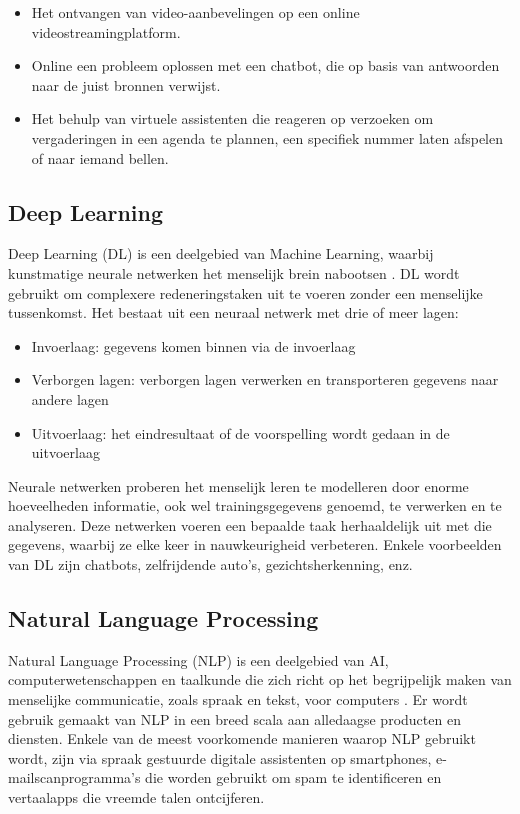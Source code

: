 \begin{itemize}
  \item Het ontvangen van video-aanbevelingen op een online videostreamingplatform.
  \item	Online een probleem oplossen met een chatbot, die op basis van antwoorden naar de juist bronnen verwijst.
  \item	Het behulp van virtuele assistenten die reageren op verzoeken om vergaderingen in een agenda te plannen, een specifiek nummer laten afspelen of naar iemand bellen.
\end{itemize}

\subsection{Deep Learning}
Deep Learning (DL) is een deelgebied van Machine Learning, waarbij kunstmatige neurale netwerken het menselijk brein nabootsen \autocite{Coursera2024a}. DL wordt gebruikt om complexere redeneringstaken uit te voeren zonder een menselijke tussenkomst. Het bestaat uit een neuraal netwerk met drie of meer lagen: 
\begin{itemize}
  \item	Invoerlaag: gegevens komen binnen via de invoerlaag
  \item	Verborgen lagen: verborgen lagen verwerken en transporteren gegevens naar andere lagen
  \item	Uitvoerlaag: het eindresultaat of de voorspelling wordt gedaan in de uitvoerlaag
\end{itemize}
Neurale netwerken proberen het menselijk leren te modelleren door enorme hoeveelheden informatie, ook wel trainingsgegevens genoemd, te verwerken en te analyseren. Deze netwerken voeren een bepaalde taak herhaaldelijk uit met die gegevens, waarbij ze elke keer in nauwkeurigheid verbeteren. Enkele voorbeelden van DL zijn chatbots, zelfrijdende auto’s, gezichtsherkenning, enz.

\subsection{Natural Language Processing}
Natural Language Processing (NLP) is een deelgebied van AI, computerwetenschappen en taalkunde die zich richt op het begrijpelijk maken van menselijke communicatie, zoals spraak en tekst, voor computers \autocite{Coursera2024b}. Er wordt gebruik gemaakt van NLP in een breed scala aan alledaagse producten en diensten. Enkele van de meest voorkomende manieren waarop NLP gebruikt wordt, zijn via spraak gestuurde digitale assistenten op smartphones, e-mailscanprogramma's die worden gebruikt om spam te identificeren en vertaalapps die vreemde talen ontcijferen.

